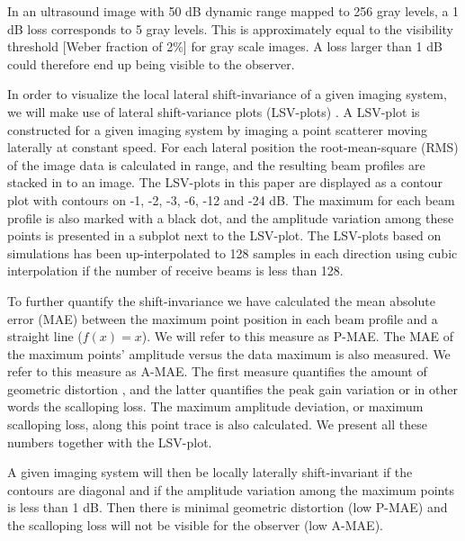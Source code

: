 \documentclass[journal]{IEEEtran}
\begin{document}
In an ultrasound image with 50 dB dynamic range mapped to 256 gray levels, a 1 dB loss corresponds to 5 gray levels. This is approximately equal to the visibility threshold [Weber fraction of 2\%] for gray scale images. A loss larger than 1 dB could therefore end up being visible to the observer. %



In order to visualize the local lateral shift-invariance of a given imaging system, we will make use of lateral shift-variance plots (LSV-plots) \cite{Hergum2007}. A LSV-plot is constructed for a given imaging system by imaging a point scatterer moving laterally at constant speed. For each lateral position the root-mean-square (RMS) of the image data is calculated in range, and the resulting beam profiles are stacked in to an image. %
The LSV-plots in this paper are displayed as a contour plot with contours on -1, -2, -3, -6, -12 and -24 dB. The maximum for each beam profile is also marked with a black dot, and the amplitude variation among these points is presented in a subplot next to the LSV-plot. The LSV-plots based on simulations has been up-interpolated to 128 samples in each direction using cubic interpolation if the number of receive beams is less than 128.

To further quantify the shift-invariance we have calculated the mean absolute error (MAE) between the maximum point position in each beam profile and a straight line ($f(x)=x$). We will refer to this measure as P-MAE. The MAE of the maximum points' amplitude versus the data maximum is also measured. We refer to this measure as A-MAE. The first measure quantifies the amount of geometric distortion \cite{Hergum2007}, and the latter quantifies the peak gain variation or in other words the scalloping loss. The maximum amplitude deviation, or maximum scalloping loss, along this point trace is also calculated. We present all these numbers together with the LSV-plot.

A given imaging system will then be locally laterally shift-invariant if the contours are diagonal and if the amplitude variation among the maximum points is less than 1 dB. Then there is minimal geometric distortion (low P-MAE) and the scalloping loss will not be visible for the observer (low A-MAE). %
\end{document}
